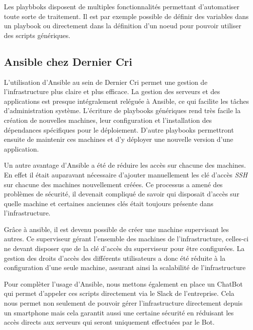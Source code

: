 \bigskip

Les playbboks disposent de multiples fonctionnalités permettant
d'automatiser toute sorte de traitement. Il est par exemple possible de
définir des variables dans un playbook ou directement dans la définition
d'un noeud pour pouvoir utiliser des scripts génériques.

\newpage

\subsection{Ansible chez Dernier Cri}\label{ansible-chez-dernier-cri}

L'utilisation d'Ansible au sein de Dernier Cri permet une gestion de
l'infrastructure plus claire et plus efficace. La gestion des serveurs
et des applications est presque intégralement reléguée à Ansible, ce qui
facilite les tâches d'administration système. L'écriture de playbooks
génériques rend très facile la création de nouvelles machines, leur
configuration et l'installation des dépendances spécifiques pour le
déploiement. D'autre playbooks permettront ensuite de maintenir ces
machines et d'y déployer une nouvelle version d'une application.

\bigskip

Un autre avantage d'Ansible a été de réduire les accès sur chacune des
machines. En effet il était auparavant nécessaire d'ajouter manuellement
les clé d'accès \emph{SSH} sur chacune des machines nouvellement créées.
Ce processus a amené des problèmes de sécurité, il devenait compliqué de
savoir qui disposait d'accès sur quelle machine et certaines anciennes
clés était toujours présente dans l'infrastructure.

\bigskip

Grâce à ansible, il est devenu possible de créer une machine supervisant
les autres. Ce superviseur gérant l'ensemble des machines de
l'infrastructure, celles-ci ne devant disposer que de la clé d'accès du
superviseur pour être configurées. La gestion des droits d'accès des
différents utilisateurs a donc été réduite à la configuration d'une
seule machine, assurant ainsi la scalabilité de l'infrastructure

\bigskip

Pour complèter l'usage d'Ansible, nous mettons également en place un
ChatBot qui permet d'appeler ces scripts directement via le Slack de
l'entreprise. Cela nous permet non seulement de pouvoir gérer
l'infrastructure directement depuis un smartphone mais cela garantit
aussi une certaine sécurité en réduisant les accès directs aux serveurs
qui seront uniquement effectuées par le Bot.

